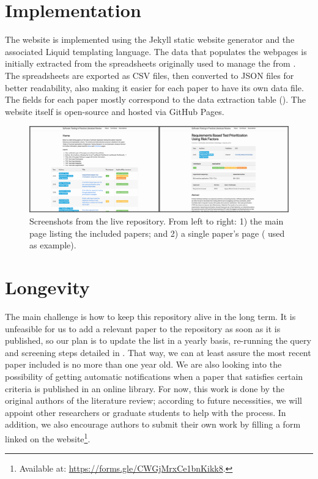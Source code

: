 \section{Implementation}\label{subsec:live_implementation}

The website is implemented using the Jekyll static website generator and the associated Liquid templating language.
The data that populates the webpages is initially extracted from the spreadsheets originally used to manage the \slr from .
The spreadsheets are exported as CSV files, then converted to JSON files for better readability, also making it easier for each paper to have its own data file.
The fields for each paper mostly correspond to the data extraction table ().
The website itself is open-source and hosted via GitHub Pages.

\begin{figure}
  \center
  \includegraphics[width=\linewidth]{figures/live_repository_screenshots_4.png}
  \caption{Screenshots from the live repository. From left to right: 1) the main page listing the included papers; and 2) a single paper's page ( used as example). }
  \label{fig:live_repository}
\end{figure}

\section{Longevity}\label{subsec:live_longevity}
The main challenge is how to keep this repository alive in the long term.
It is unfeasible for us to add a relevant paper to the repository as soon as it is published, so our plan is to update the list in a yearly basis, re-running the query and screening steps detailed in .
That way, we can at least assure the most recent paper included is no more than one year old.
We are also looking into the possibility of getting automatic notifications when a paper that satisfies certain criteria is published in an online library.
For now, this work is done by the original authors of the literature review; according to future necessities, we will appoint other researchers or graduate students to help with the process.
In addition, we also encourage authors to submit their own work by filling a form linked on the website\footnote{Available at: \url{https://forms.gle/CWGjMrxCe1bnKikk8}.}.


